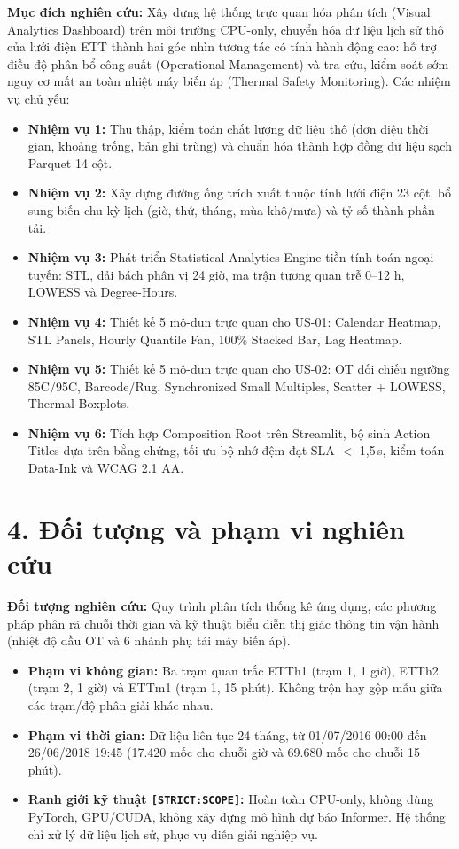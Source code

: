 \documentclass[12pt,a4paper,oneside]{report}
\newcommand{\dC}{\textdegree C\xspace}
\newcommand{\code}[1]{\texttt{#1}}
\begin{document}
\textbf{Mục đích nghiên cứu:} Xây dựng hệ thống trực quan hóa phân tích (Visual Analytics Dashboard) trên môi trường CPU-only, chuyển hóa dữ liệu lịch sử thô của lưới điện ETT thành hai góc nhìn tương tác có tính hành động cao: hỗ trợ điều độ phân bổ công suất (Operational Management) và tra cứu, kiểm soát sớm nguy cơ mất an toàn nhiệt máy biến áp (Thermal Safety Monitoring). Các nhiệm vụ chủ yếu:
\begin{itemize}
  \item \textbf{Nhiệm vụ 1:} Thu thập, kiểm toán chất lượng dữ liệu thô (đơn điệu thời gian, khoảng trống, bản ghi trùng) và chuẩn hóa thành hợp đồng dữ liệu sạch Parquet 14 cột.
  \item \textbf{Nhiệm vụ 2:} Xây dựng đường ống trích xuất thuộc tính lưới điện 23 cột, bổ sung biến chu kỳ lịch (giờ, thứ, tháng, mùa khô/mưa) và tỷ số thành phần tải.
  \item \textbf{Nhiệm vụ 3:} Phát triển Statistical Analytics Engine tiền tính toán ngoại tuyến: STL, dải bách phân vị 24 giờ, ma trận tương quan trễ 0--12 h, LOWESS và Degree-Hours.
  \item \textbf{Nhiệm vụ 4:} Thiết kế 5 mô-đun trực quan cho US-01: Calendar Heatmap, STL Panels, Hourly Quantile Fan, 100\% Stacked Bar, Lag Heatmap.
  \item \textbf{Nhiệm vụ 5:} Thiết kế 5 mô-đun trực quan cho US-02: OT đối chiếu ngưỡng 85\dC/95\dC, Barcode/Rug, Synchronized Small Multiples, Scatter + LOWESS, Thermal Boxplots.
  \item \textbf{Nhiệm vụ 6:} Tích hợp Composition Root trên Streamlit, bộ sinh Action Titles dựa trên bằng chứng, tối ưu bộ nhớ đệm đạt SLA $<$ 1,5\,s, kiểm toán Data-Ink và WCAG 2.1 AA.
\end{itemize}

\section*{4. Đối tượng và phạm vi nghiên cứu}

\textbf{Đối tượng nghiên cứu:} Quy trình phân tích thống kê ứng dụng, các phương pháp phân rã chuỗi thời gian và kỹ thuật biểu diễn thị giác thông tin vận hành (nhiệt độ dầu OT và 6 nhánh phụ tải máy biến áp).
\begin{itemize}
  \item \textbf{Phạm vi không gian:} Ba trạm quan trắc ETTh1 (trạm 1, 1 giờ), ETTh2 (trạm 2, 1 giờ) và ETTm1 (trạm 1, 15 phút). Không trộn hay gộp mẫu giữa các trạm/độ phân giải khác nhau.
  \item \textbf{Phạm vi thời gian:} Dữ liệu liên tục 24 tháng, từ 01/07/2016 00:00 đến 26/06/2018 19:45 (17.420 mốc cho chuỗi giờ và 69.680 mốc cho chuỗi 15 phút).
  \item \textbf{Ranh giới kỹ thuật \code{[STRICT:SCOPE]}:} Hoàn toàn CPU-only, không dùng PyTorch, GPU/CUDA, không xây dựng mô hình dự báo Informer. Hệ thống chỉ xử lý dữ liệu lịch sử, phục vụ diễn giải nghiệp vụ.
\end{itemize}
\end{document}
